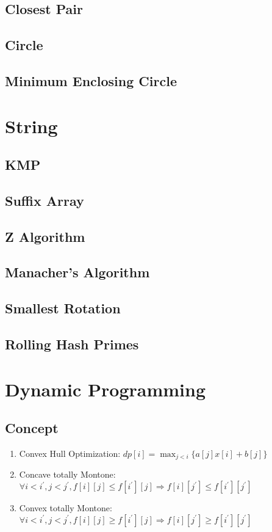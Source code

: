 \documentclass[a4paper,10pt,twocolumn,oneside]{article}
\begin{document}
\subsection{Closest Pair}

\subsection{Circle}

\subsection{Minimum Enclosing Circle}

\section{String}
\subsection{KMP}

\subsection{Suffix Array}

\subsection{Z Algorithm}

\subsection{Manacher's Algorithm}

\subsection{Smallest Rotation}

\subsection{Rolling Hash Primes}

\section{Dynamic Programming}
\subsection{Concept}
\begin{enumerate}
    \item Convex Hull Optimization: $dp[i] = \max_{j < i} \{ a[j]x[i] + b[j] \}$
    \item Concave totally Montone: $\forall i < i^\prime, j < j^\prime, f[i][j]\leq f[i^\prime][j]\Rightarrow f[i][j^\prime]\leq f[i^\prime][j^\prime]$
    \item Convex totally Montone: $\forall i < i^\prime, j < j^\prime, f[i][j]\geq f[i^\prime][j]\Rightarrow f[i][j^\prime]\geq f[i^\prime][j^\prime]$
\end{enumerate}
\end{document}
